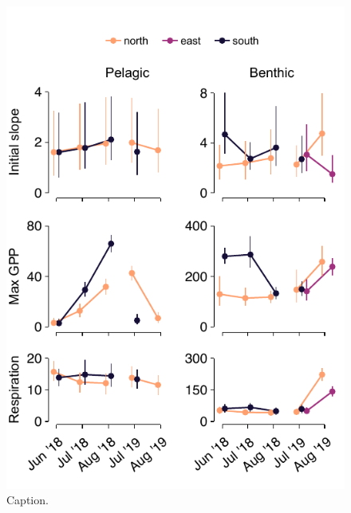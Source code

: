 \documentclass[12pt]{article}
\begin{document}
\begin{figure}
\centering
\linespread{1}
\includegraphics{../analysis/figures/fig_par.pdf}
\caption{\label{fig:par}
Caption. 
}
\end{figure}

\clearpage

\end{document}
